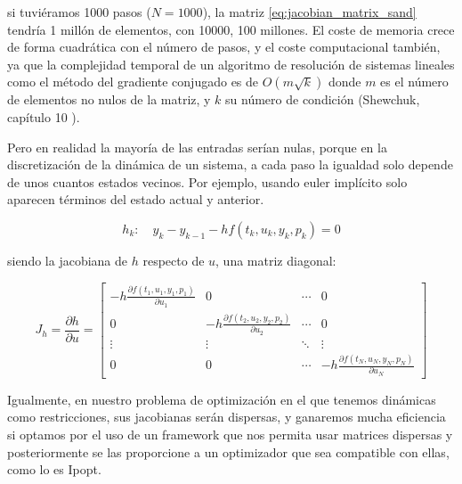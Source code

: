 si tuviéramos 1000 pasos ($N=1000$), la matriz \eqref{eq:jacobian_matrix_sand}
tendría 1 millón de elementos, con 10000, 100 millones. El coste de memoria
crece de forma cuadrática con el número de pasos, y el coste computacional
también, ya que la complejidad temporal de un algoritmo de resolución de
sistemas lineales como el método del gradiente conjugado es de $O(m\sqrt{k})$
donde $m$ es el número de elementos no nulos de la matriz, y $k$ su número de
condición (Shewchuk, capítulo 10 \cite{shewchuk1994introduction}).

Pero en realidad la mayoría de las entradas serían nulas, porque en la
discretización de la dinámica de un sistema, a cada paso la igualdad solo
depende de unos cuantos estados vecinos. Por ejemplo, usando euler implícito
solo aparecen términos del estado actual y anterior.

\begin{equation} \label{eq:implicit_euler_equality}
	h_k: \quad y_k - y_{k-1} - h f(t_k, u_k, y_k, p_k) = 0
\end{equation}

siendo la jacobiana de $h$ respecto de $u$, una matriz diagonal:

\begin{equation} \label{eq:diagonal_jacobian}
	J_h = \frac{\partial h}{\partial u} =
	\begin{bmatrix}
		-h \frac{\partial f(t_1, u_1, y_1, p_1)}{\partial u_1} & 0                                                      & \cdots & 0                                                      \\
		0                                                      & -h \frac{\partial f(t_2, u_2, y_2, p_2)}{\partial u_2} & \cdots & 0                                                      \\
		\vdots                                                 & \vdots                                                 & \ddots & \vdots                                                 \\
		0                                                      & 0                                                      & \cdots & -h \frac{\partial f(t_N, u_N, y_N, p_N)}{\partial u_N}
	\end{bmatrix}
\end{equation}

Igualmente, en nuestro problema de optimización en el que tenemos dinámicas
como restricciones, sus jacobianas serán dispersas, y ganaremos mucha eficiencia
si optamos por el uso de un framework que nos permita usar matrices dispersas y
posteriormente se las proporcione a un optimizador que sea compatible con ellas,
como lo es Ipopt.

